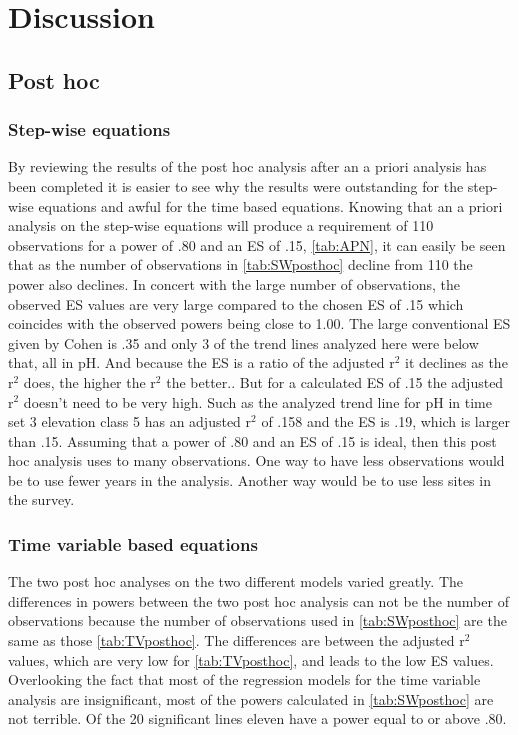 \section{Discussion}

\subsection{Post hoc}

\subsubsection{Step-wise equations}

By reviewing the results of the post hoc analysis after an a priori analysis has been completed it is easier to see why the results were outstanding for the step-wise equations and awful for the time based equations.
Knowing that an a priori analysis on the step-wise equations will produce a requirement of 110 observations for a power of .80 and an ES of .15, \autoref{tab:APN}, it can easily be seen that as the number of observations in \autoref{tab:SWposthoc} decline from 110 the power also declines.
In concert with the large number of observations, the observed ES values are very large compared to the chosen ES of .15 which coincides with the observed powers being close to 1.00.
The large conventional ES given by Cohen is .35 and only 3 of the trend lines analyzed here were below that, all in pH.
And because the ES is a ratio of the adjusted r$^2$ it declines as the r$^2$ does, the higher the r$^2$ the better..
But for a calculated ES of .15 the adjusted r$^2$ doesn't need to be very high.
Such as the analyzed trend line for pH in time set 3 elevation class 5 has an adjusted r$^2$ of .158 and the ES is .19, which is larger than .15.
Assuming that a power of .80 and an ES of .15 is ideal, then this post hoc analysis uses to many observations.
One way to have less observations would be to use fewer years in the analysis.
Another way would be to use less sites in the survey.

\subsubsection{Time variable based equations}%
The two post hoc analyses on the two different models varied greatly.
The differences in powers between the two post hoc analysis can not be the number of observations because the number of observations used in \autoref{tab:SWposthoc} are the same as those \autoref{tab:TVposthoc}.
The differences are between the adjusted r$^2$ values, which are very low for \autoref{tab:TVposthoc}, and leads to the low ES values.
Overlooking the fact that most of the regression models for the time variable analysis are insignificant, most of the powers calculated in \autoref{tab:SWposthoc} are not terrible.
Of the 20 significant lines eleven have a power equal to or above .80.

